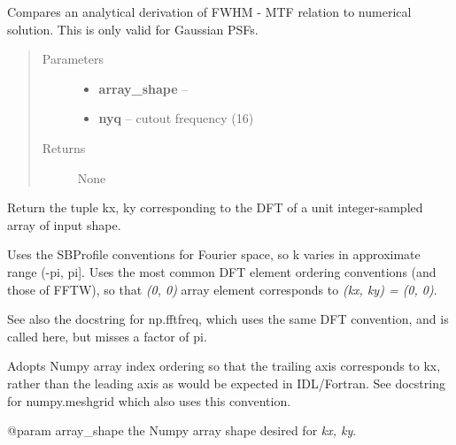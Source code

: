 \documentclass[a4paper,11pt,english]{sphinxmanual}
\begin{document}

\begin{fulllineitems}
\label{instrument:sandbox.MTF.compareAnalytical}
Compares an analytical derivation of FWHM - MTF relation to numerical solution.
This is only valid for Gaussian PSFs.
\begin{quote}\begin{description}
\item[{Parameters}] \leavevmode\begin{itemize}
\item {} 
\textbf{array\_shape} -- 

\item {} 
\textbf{nyq} -- cutout frequency (16)

\end{itemize}

\item[{Returns}] \leavevmode
None

\end{description}\end{quote}

\end{fulllineitems}


\begin{fulllineitems}
\label{instrument:sandbox.MTF.kxky}
Return the tuple kx, ky corresponding to the DFT of a unit integer-sampled array of input
shape.

Uses the SBProfile conventions for Fourier space, so k varies in approximate range (-pi, pi{]}.
Uses the most common DFT element ordering conventions (and those of FFTW), so that \emph{(0, 0)}
array element corresponds to \emph{(kx, ky) = (0, 0)}.

See also the docstring for np.fftfreq, which uses the same DFT convention, and is called here,
but misses a factor of pi.

Adopts Numpy array index ordering so that the trailing axis corresponds to kx, rather than the
leading axis as would be expected in IDL/Fortran.  See docstring for numpy.meshgrid which also
uses this convention.

@param array\_shape   the Numpy array shape desired for \emph{kx, ky}.

\end{fulllineitems}
\end{document}
